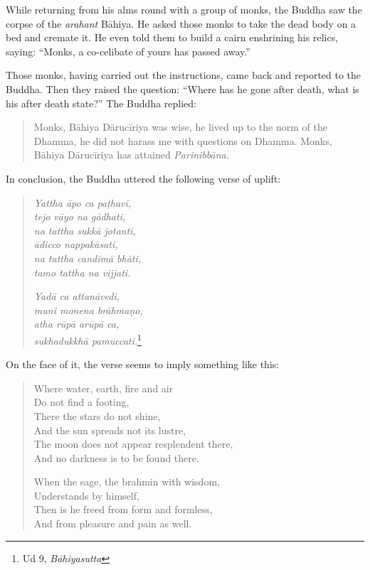 While returning from his alms round with a group of monks, the Buddha saw the corpse of the \emph{arahant} Bāhiya. He asked those monks to take the dead body on a bed and cremate it. He even told them to build a cairn enshrining his relics, saying: ``Monks, a co-celibate of yours has passed away.''

Those monks, having carried out the instructions, came back and reported to the Buddha. Then they raised the question: ``Where has he gone after death, what is his after death state?'' The Buddha replied:

\begin{quote}
Monks, Bāhiya Dārucīriya was wise, he lived up to the norm of the Dhamma, he did not harass me with questions on Dhamma. Monks, Bāhiya Dārucīriya has attained \emph{Parinibbāna}.
\end{quote}

In conclusion, the Buddha uttered the following verse of uplift:

\begin{quote}
\emph{Yattha āpo ca paṭhavī,}\\
\emph{tejo vāyo na gādhati,}\\
\emph{na tattha sukkā jotanti,}\\
\emph{ādicco nappakāsati,}\\
\emph{na tattha candimā bhāti,}\\
\emph{tamo tattha na vijjati.}

\emph{Yadā ca attanāvedi,}\\
\emph{muni monena brāhmaṇo,}\\
\emph{atha rūpā arūpā ca,}\\
\emph{sukhadukkhā pamuccati.}\footnote{Ud 9, \emph{Bāhiyasutta}}
\end{quote}

On the face of it, the verse seems to imply something like this:

\begin{quote}
Where water, earth, fire and air\\
Do not find a footing,\\
There the stars do not shine,\\
And the sun spreads not its lustre,\\
The moon does not appear resplendent there,\\
And no darkness is to be found there.

When the sage, the brahmin with wisdom,\\
Understands by himself,\\
Then is he freed from form and formless,\\
And from pleasure and pain as well.
\end{quote}

